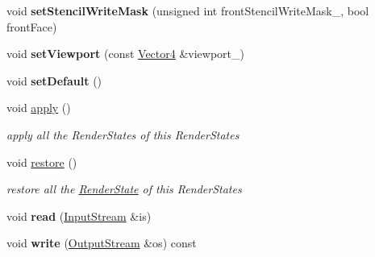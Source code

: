 \begin{DoxyCompactItemize}
\item 
void {\bfseries set\+Stencil\+Write\+Mask} (unsigned int front\+Stencil\+Write\+Mask\+\_\+, bool front\+Face)\hypertarget{class_i_dream_sky_1_1_material_1_1_state_block_ab764071f5f605ae73f683ce6471c8ea3}{}\label{class_i_dream_sky_1_1_material_1_1_state_block_ab764071f5f605ae73f683ce6471c8ea3}

\item 
void {\bfseries set\+Viewport} (const \hyperlink{class_i_dream_sky_1_1_vector4}{Vector4} \&viewport\+\_\+)\hypertarget{class_i_dream_sky_1_1_material_1_1_state_block_a69f20148c92e2a4b6ffe64650abd99e2}{}\label{class_i_dream_sky_1_1_material_1_1_state_block_a69f20148c92e2a4b6ffe64650abd99e2}

\item 
void {\bfseries set\+Default} ()\hypertarget{class_i_dream_sky_1_1_material_1_1_state_block_a43c3675a384583e1b725691a43d85405}{}\label{class_i_dream_sky_1_1_material_1_1_state_block_a43c3675a384583e1b725691a43d85405}

\item 
void \hyperlink{class_i_dream_sky_1_1_material_1_1_state_block_a82fd9b828a2fc1baafadf3bc88542517}{apply} ()\hypertarget{class_i_dream_sky_1_1_material_1_1_state_block_a82fd9b828a2fc1baafadf3bc88542517}{}\label{class_i_dream_sky_1_1_material_1_1_state_block_a82fd9b828a2fc1baafadf3bc88542517}

\begin{DoxyCompactList}\small\item\em apply all the Render\+States of this Render\+States \end{DoxyCompactList}\item 
void \hyperlink{class_i_dream_sky_1_1_material_1_1_state_block_a8448dc8f012f07065f881476c660ea73}{restore} ()\hypertarget{class_i_dream_sky_1_1_material_1_1_state_block_a8448dc8f012f07065f881476c660ea73}{}\label{class_i_dream_sky_1_1_material_1_1_state_block_a8448dc8f012f07065f881476c660ea73}

\begin{DoxyCompactList}\small\item\em restore all the \hyperlink{class_i_dream_sky_1_1_material_1_1_render_state}{Render\+State} of this Render\+States \end{DoxyCompactList}\item 
void {\bfseries read} (\hyperlink{class_i_dream_sky_1_1_input_stream}{Input\+Stream} \&is)\hypertarget{class_i_dream_sky_1_1_material_1_1_state_block_a3b40823607d02f122e5ef2267a8c4509}{}\label{class_i_dream_sky_1_1_material_1_1_state_block_a3b40823607d02f122e5ef2267a8c4509}

\item 
void {\bfseries write} (\hyperlink{class_i_dream_sky_1_1_output_stream}{Output\+Stream} \&os) const \hypertarget{class_i_dream_sky_1_1_material_1_1_state_block_a685db9fb2920542f95e9fecd2ce79369}{}\label{class_i_dream_sky_1_1_material_1_1_state_block_a685db9fb2920542f95e9fecd2ce79369}

\end{DoxyCompactItemize}
